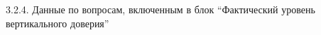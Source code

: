 \begin{frame}{3.2.4. Данные по вопросам, включенным в блок ``Фактический уровень вертикального доверия'' }
\begin{tabular}{lccl}
\end{tabular}


\end{frame}


